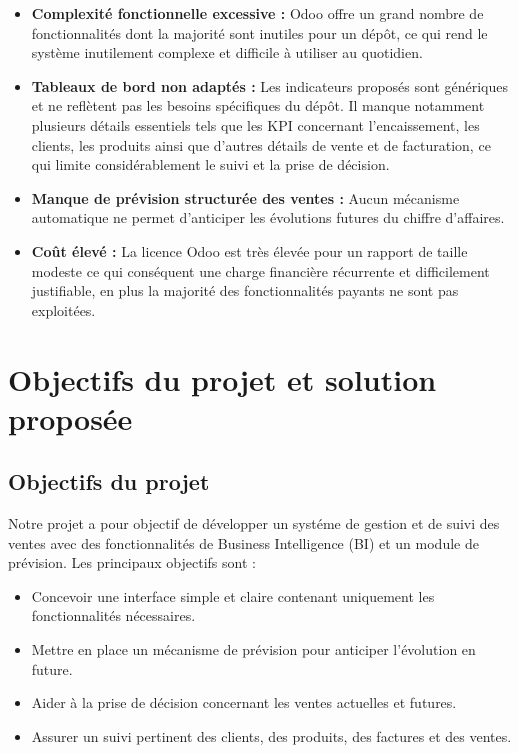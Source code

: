 \begin{itemize}[leftmargin=*, noitemsep]
    \item \textbf{Complexité fonctionnelle excessive :}
    Odoo offre un grand nombre de fonctionnalités dont la majorité sont inutiles
    pour un dépôt, ce qui rend le système inutilement complexe et difficile à
    utiliser au quotidien.

    \item \textbf{Tableaux de bord non adaptés :}
    Les indicateurs proposés sont génériques et ne reflètent pas les besoins
    spécifiques du dépôt. Il manque notamment plusieurs détails essentiels tels que les  KPI concernant l'encaissement,
    les clients, les produits ainsi que d'autres détails de vente et de facturation,
    ce qui limite considérablement le suivi et la prise de décision.

    \item \textbf{Manque de prévision structurée des ventes :}
    Aucun mécanisme automatique ne permet d'anticiper les évolutions futures
    du chiffre d'affaires.

    \item \textbf{Coût élevé :}
    La licence Odoo est très élevée pour un rapport de taille modeste ce qui conséquent une charge financière récurrente
    et difficilement justifiable, en plus la majorité des fonctionnalités payants ne sont pas exploitées.
\end{itemize}

\section{Objectifs du projet et solution proposée}
\label{sec:ch1:objectifs}

\subsection{Objectifs du projet}

Notre projet a pour objectif de développer un systéme  de gestion et de suivi
des ventes avec des fonctionnalités de Business Intelligence (BI) et un module de
prévision. Les principaux objectifs sont :

\begin{itemize}[leftmargin=*, noitemsep]
    \item Concevoir une interface simple et claire contenant uniquement les
    fonctionnalités nécessaires.
    \item Mettre en place un mécanisme de prévision pour anticiper l'évolution en future.
    \item Aider à la prise de décision concernant les ventes actuelles et futures.
    \item Assurer un suivi pertinent des clients, des produits, des factures et
    des ventes.
\end{itemize}

